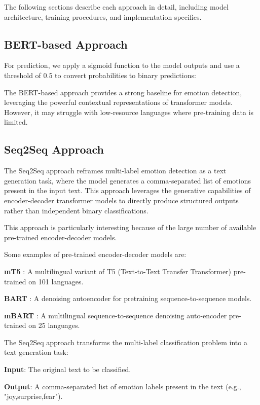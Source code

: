 \documentclass[a4paper,12pt]{extarticle}
\begin{document}
The following sections describe each approach in detail, including model architecture, training procedures, and implementation specifics.

\subsection{BERT-based Approach}

For prediction, we apply a sigmoid function to the model outputs and use a threshold of 0.5 to convert probabilities to binary predictions:

The BERT-based approach provides a strong baseline for emotion detection, leveraging the powerful contextual representations of transformer models. However, it may struggle with low-resource languages where pre-training data is limited.

\subsection{Seq2Seq Approach}

The Seq2Seq approach reframes multi-label emotion detection as a text generation task, where the model generates a comma-separated list of emotions present in the input text. This approach leverages the generative capabilities of encoder-decoder transformer models to directly produce structured outputs rather than independent binary classifications.

This approach is particularly interesting because of the large number of available pre-trained encoder-decoder models.

Some examples of pre-trained encoder-decoder models are:

\textbf{mT5} \cite{xue2021mt5massivelymultilingualpretrained}: A multilingual variant of T5 (Text-to-Text Transfer Transformer) pre-trained on 101 languages. 

\textbf{BART} \cite{lewis2019bartdenoisingsequencetosequencepretraining}: A denoising autoencoder for pretraining sequence-to-sequence models. 

\textbf{mBART} \cite{liu2020multilingualdenoisingpretrainingneural}: A multilingual sequence-to-sequence denoising auto-encoder pre-trained on 25 languages.

The Seq2Seq approach transforms the multi-label classification problem into a text generation task:

\textbf{Input}: The original text to be classified. 

\textbf{Output}: A comma-separated list of emotion labels present in the text (e.g., "joy,surprise,fear").
\end{document}
